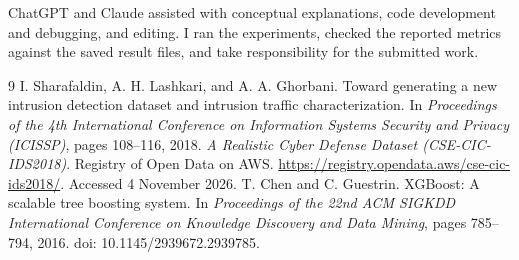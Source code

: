 \documentclass{article}
\begin{document}
ChatGPT and Claude assisted with conceptual explanations, code development and debugging, and editing. I ran the experiments, checked the reported metrics against the saved result files, and take responsibility for the submitted work.

\begin{thebibliography}{9}
I. Sharafaldin, A. H. Lashkari, and A. A. Ghorbani. Toward generating a new intrusion detection dataset and intrusion traffic characterization. In \textit{Proceedings of the 4th International Conference on Information Systems Security and Privacy (ICISSP)}, pages 108--116, 2018.
\emph{A Realistic Cyber Defense Dataset (CSE-CIC-IDS2018)}. Registry of Open Data on AWS. \url{https://registry.opendata.aws/cse-cic-ids2018/}. Accessed 4 November 2026.
T. Chen and C. Guestrin. XGBoost: A scalable tree boosting system. In \textit{Proceedings of the 22nd ACM SIGKDD International Conference on Knowledge Discovery and Data Mining}, pages 785--794, 2016. doi: 10.1145/2939672.2939785.
\end{thebibliography}
\end{document}
